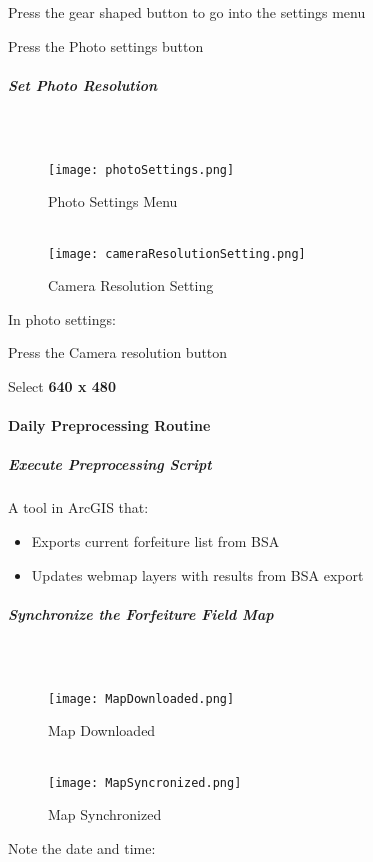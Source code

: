 \documentclass[class=article , crop=false, titlepage, twoside, multi={itemize, figure, verbatim}, float=false]{standalone}
\begin{document}
\noindent Press the gear shaped button to go into the settings menu\\
\vspace{3in}

\noindent Press the Photo settings button\\

\clearpage
\subparagraph*{Set Photo Resolution}

\subparagraph*{\\}
\begin{wrapfigure}{r}{0.5\textwidth}
\centering
\texttt{[image: photoSettings.png]}
\caption{Photo Settings Menu}
\vspace{.25in}
\HRule \\[.4cm] %
\vspace{.25in}
\texttt{[image: cameraResolutionSetting.png]}
\caption{Camera Resolution Setting}
\end{wrapfigure}
In photo settings:\\
\vspace{1in}

\noindent Press the Camera resolution button\\
\vspace{3in}

\noindent Select \textbf{640 x 480}\\
\clearpage
\paragraph{Daily Preprocessing Routine}

\subparagraph{Execute Preprocessing Script}A tool in ArcGIS that:

\begin{itemize}

\item Exports current forfeiture list from BSA
\item Updates webmap layers with results from BSA export


\end{itemize}

\clearpage
\subparagraph{Synchronize the Forfeiture Field Map\\}

\subparagraph*{\\}
\begin{wrapfigure}{r}{0.5\textwidth}
\centering
\texttt{[image: MapDownloaded.png]}
\caption{Map Downloaded}
\vspace{.25in}
\HRule \\[.4cm] %
\vspace{.25in}
\texttt{[image: MapSyncronized.png]}
\caption{Map Synchronized}
\end{wrapfigure}
Note the date and time:
\vspace{1.5in}
\end{document}
